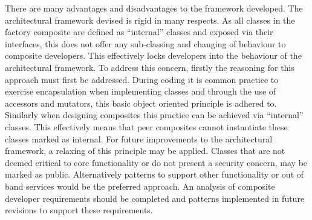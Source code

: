 		There are many advantages and disadvantages to the framework developed.  The architectural framework devised is rigid in many respects.  
		As all classes in the factory composite are defined as ``internal'' classes and exposed via their interfaces, this does not offer any sub-classing 
		and changing of behaviour to composite developers.  This effectively locks developers into the behaviour of the architectural framework.
		\newline
		\newline
		To address this concern, firstly the reasoning for this approach must first be addressed.  During coding it is common practice to exercise encapsulation
		when implementing classes and through the use of accessors and mutators, this basic object oriented principle is adhered to.  Similarly when designing composites
		this practice can be achieved via ``internal'' classes.  This effectively means that peer composites cannot instantiate these classes marked as internal.
		\newline
		\newline
		For future improvements to the architectural framework, a relaxing of this principle may be applied.  Classes that are not deemed critical to core
		functionality or do not present a security concern, may be marked as public.  Alternatively patterns to support other functionality or
		out of band services would be the preferred approach.  An analysis of composite developer requirements should be completed and patterns implemented in 
		future revisions to support these requirements.
		
		

